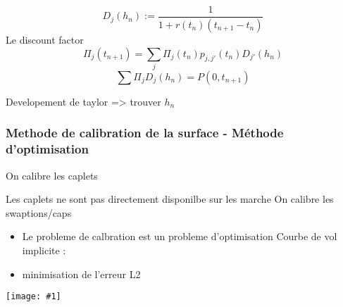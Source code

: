 \documentclass[paper=a4, fontsize=11pt]{scrartcl}
\numberwithin{equation}{section}		%
\numberwithin{figure}{section}			%
\numberwithin{table}{section}				%
\theoremstyle{definition}
\newcommand{\IMG}[3]{
  \begin{center}
    \texttt{[image: \#1]}%
    \end{center}
}
\begin{document}
$$D_j(h_n) := \frac{1}{1 + r(t_n)(t_{n+1} - t_n)} $$ Le discount factor
$$ \Pi_j(t_{n+1}) = \sum_j \Pi_j(t_n) p_{j, j'}(t_n) D_{j'}(h_n)$$
$$ \sum \Pi_j D_j(h_n) = P(0, t_{n+1}) $$

Developement de taylor => trouver $h_n$


\subsubsection{Methode de calibration de la surface - Méthode d'optimisation}

On calibre les caplets

Les caplets ne sont pas directement disponilbe sur les marche
On calibre les swaptions/caps

\begin{itemize}
\item Le probleme de calbration est un probleme d'optimisation Courbe
  de vol implicite :
\item minimisation de l'erreur L2
\end{itemize}
\IMG{img/capsurf.png}{Cap surface}{0.5}
\end{document}
